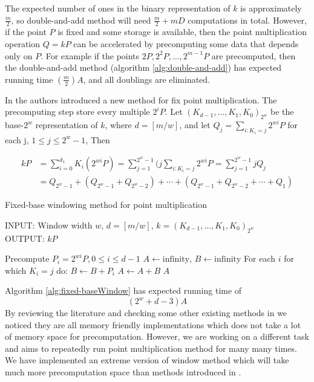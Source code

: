 The expected number of ones in the binary representation of $k$ is approximately $\frac{m}{2}$, so double-and-add method will need $\frac{m}{2} + mD$ computations in total. However, if the point $P$ is fixed and some storage is available, then the point multiplication operation $Q=kP$ can be accelerated by precomputing some data that depends only on $P$. For example if the points $2P, 2^2P, \dots, 2^{m-1}P$ are precomputed, then the double-and-add method (algorithm \ref{alg:double-and-add}) has expected running time $(\frac{m}{2})A$, and all doublings are eliminated.

In \cite{brickell1993fast} the authors introduced a new method for fix point multiplication. The precomputing step store every multiple $2^iP$. Let $(K_{d-1},\dots,K_1,K_0)_{2^w}$ be the base-$2^w$ representation of $k$, where $d = [m/w]$, and let $Q_j = \sum_{i:K_i=j}2^{wi}P$ for each j, $1 \leq j \leq 2^w-1$, Then 

\begin{equation} 
\begin{split}
kP &= \sum_{i=0}^{d_1}K_i(2^{wi}P) = \sum_{j=1}^{2^w-1}(j\sum_{i:K_i=j}2^{wi}P = \sum_{j=1}^{2^w-1}jQ_j\\
&= Q_{2^w-1}+(Q_{2^w-1}+Q_{2^w-2})+\cdots+(Q_{2^w-1}+Q_{2^w-2}+\cdots+Q_1)
\end{split}
\end{equation}


\begin{algorithm}[H] 
	\caption{Fixed-base windowing method for point multiplication\cite{hankerson2006guide}}
	\label{alg:fixed-baseWindow}
	INPUT: Window width $w$, $d = [m/w]$, $k=(K_{d-1},\dots,K_1,K_0)_{2^w}$\\
	OUTPUT: $kP$
	\begin{algorithmic} [1]
		\STATE Precompute $P_i = 2^{wi}P, 0 \leq i \leq d-1$
		\STATE $A \leftarrow \text{infinity}$, $B \leftarrow \text{infinity}$
		\STATE For each $i$ for which $K_i = j$ do: $B \leftarrow B + P_i$
		\STATE $A \leftarrow A+B$
		\ENDFOR
		\RETURN $A$
	\end{algorithmic}
\end{algorithm}

Algorithm \ref{alg:fixed-baseWindow} has expected running time of  $$(2^w+d-3)A$$ 
By reviewing the literature and checking some other existing methods in \cite{hankerson2006guide} we noticed they are all memory friendly implementations which does not take a lot of memory space for precomputation. However, we are working on a different task and aims to repeatedly run point multiplication method for many many times. We have implemented an extreme version of window method which will take much more precomputation space than methods introduced in \cite{hankerson2006guide}. 

